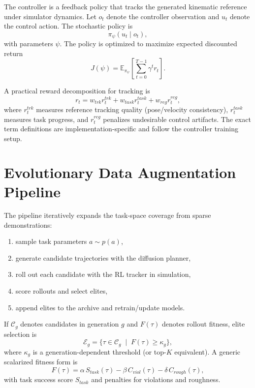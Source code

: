 The controller is a feedback policy that tracks the generated kinematic reference under simulator dynamics. Let $o_t$ denote the controller observation and $u_t$ denote the control action. The stochastic policy is
\begin{equation}
\pi_\psi(u_t \mid o_t),
\end{equation}
with parameters $\psi$. The policy is optimized to maximize expected discounted return
\begin{equation}
J(\psi)=\mathbb{E}_{\pi_\psi}\!\left[\sum_{t=0}^{T-1}\gamma^t r_t\right].
\label{eq:ppo_obj_generic}
\end{equation}

A practical reward decomposition for tracking is
\begin{equation}
r_t = w_{trk} r_t^{trk} + w_{task} r_t^{task} + w_{reg} r_t^{reg},
\label{eq:tracker_reward_decomp}
\end{equation}
where $r_t^{trk}$ measures reference tracking quality (pose/velocity consistency), $r_t^{task}$ measures task progress, and $r_t^{reg}$ penalizes undesirable control artifacts. The exact term definitions are implementation-specific and follow the controller training setup.

\section{Evolutionary Data Augmentation Pipeline}
\label{sec:evolutionary_pipeline}

The pipeline iteratively expands the task-space coverage from sparse demonstrations:
\begin{enumerate}
    \item sample task parameters $a \sim p(a)$,
    \item generate candidate trajectories with the diffusion planner,
    \item roll out each candidate with the RL tracker in simulation,
    \item score rollouts and select elites,
    \item append elites to the archive and retrain/update models.
\end{enumerate}

If $\mathcal{C}_g$ denotes candidates in generation $g$ and $F(\tau)$ denotes rollout fitness, elite selection is
\begin{equation}
\mathcal{E}_g = \{\tau \in \mathcal{C}_g \;\mid\; F(\tau) \ge \kappa_g\},
\label{eq:elite_selection}
\end{equation}
where $\kappa_g$ is a generation-dependent threshold (or top-$K$ equivalent). A generic scalarized fitness form is
\begin{equation}
F(\tau)=\alpha\,S_{task}(\tau)-\beta\,C_{viol}(\tau)-\delta\,C_{rough}(\tau),
\label{eq:fitness_scalar}
\end{equation}
with task success score $S_{task}$ and penalties for violations and roughness.

